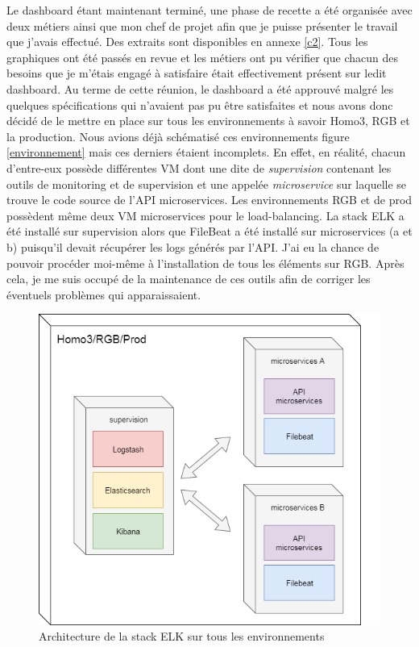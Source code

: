 	Le dashboard étant maintenant terminé, une phase de recette a été organisée avec deux métiers ainsi que mon chef de projet afin que je puisse présenter le travail que j'avais effectué. Des extraits sont disponibles en annexe \ref{c2}. Tous les graphiques ont été passés en revue et les métiers ont pu vérifier que chacun des besoins que je m'étais engagé à satisfaire était effectivement présent sur ledit dashboard. Au terme de cette réunion, le dashboard a été approuvé malgré les quelques spécifications qui n'avaient pas pu être satisfaites et nous avons donc décidé de le mettre en place sur tous les environnements à savoir Homo3, RGB et la production. Nous avions déjà schématisé ces environnements figure \ref{environnement} mais ces derniers étaient incomplets. En effet, en réalité, chacun d'entre-eux possède différentes VM dont une dite de \textit{supervision} contenant les outils de monitoring et de supervision et une appelée \textit{microservice} sur laquelle se trouve le code source de l'API microservices. Les environnements RGB et de prod possèdent même deux VM microservices pour le load-balancing. La stack ELK a été installé sur supervision alors que FileBeat a été installé sur microservices (a et b) puisqu'il devait récupérer les logs générés par l'API. J'ai eu la chance de pouvoir procéder moi-même à l'installation de tous les éléments sur RGB. Après cela, je me suis occupé de la maintenance de ces outils afin de corriger les éventuels problèmes qui apparaissaient.\\
	
\begin{figure}[h!]
	\includegraphics[scale=0.5]{images/travailNeuflizeOBC/dashboard/elkDeploiement.png}
	\centering
	\caption{Architecture de la stack ELK sur tous les environnements}
	\label{elkDeploiement}
\end{figure}